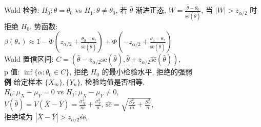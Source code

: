 \documentclass[a4paper, landscape,10pt]{article}
\begin{document}
\begin{multicols}{4}
Wald 检验: $H_0: \theta = \theta_0$ vs $H_1: \theta \neq \theta_0$,
若 $\hat \theta$ 渐进正态, $W = \frac{\hat \theta - \theta_0}{\hat {\mathrm{se}}(\hat \theta)}$, 当 $|W| > z_{\alpha / 2}$ 时拒绝 $H_0$. 势函数: \\
$\beta(\theta_*)\approx
1 - \Phi(z_{\alpha / 2} + \frac{\theta_0 - \theta_*}{\hat {\mathrm{se}}(\hat \theta)})
+\Phi(-z_{\alpha / 2} + \frac{\theta_0 - \theta_*}{\hat {\mathrm{se}}(\hat \theta)})$\\
Wald 置信区间: $C = \left(\hat \theta - z_{\alpha / 2} \hat {\mathrm{se}}(\hat \theta), \hat \theta + z_{\alpha / 2} \hat {\mathrm{se}}(\hat \theta)\right)$, \\
p 值: $\inf \{\alpha : \theta_0 \in C\}$, 拒绝 $H_0$ 的最小检验水平, 拒绝的强弱 \\
{\bfseries 例} 给定样本 $\{X_m\}, \{Y_n\}$, 检验均值是否相等. \\
$H_0: \mu_X - \mu_Y = 0$ vs $H_1: \mu_X - \mu_Y \neq 0$, \\
$V(\hat \theta) = V(\overline X - \overline Y) = \frac{\sigma_X^2}{m} + \frac{\sigma_Y^2}{n}$, 
$\hat {\mathrm{se}} = \sqrt{\frac{S_X^2}{m} + \frac{S_Y^2}{n}}$, \\
拒绝域为
$|\overline X - \overline Y| > z_{\alpha / 2} \hat {\mathrm{se}}$, \\

\newcolumn


\end{multicols}
\end{document}
